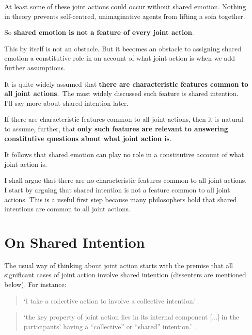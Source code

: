 \documentclass[12pt,a4paper]{extarticle}
\begin{document}
At least some of these joint actions could occur without shared emotion.  Nothing in theory prevents self-centred, unimaginative agents from lifting a sofa together.

So \textbf{shared emotion is not a feature of every joint action}.

This by itself is not an obstacle.  But it becomes an obstacle to assigning shared emotion a constitutive role in an account of what joint action is when we add further assumptions.

It is quite widely assumed that \textbf{there are characteristic features common to all joint actions}.\footnotemark \  The most widely discussed such feature is shared intention.  I'll say more about shared intention later.

If there are characteristic features common to all joint actions, then it is natural to assume, further, that \textbf{only such features are relevant to answering constitutive questions about what joint action is}.

It follows that shared emotion can play no role in a constitutive account of what joint action is.

I shall argue that there are no characteristic features common to all joint actions.  I start by arguing that shared intention is not a feature common to all joint actions.  This is a useful first step because many philosophers hold that shared intentions are common to all joint actions. 


\section{On Shared Intention}

The usual way of thinking about joint action starts with the premise that all significant cases of joint action involve shared intention (dissenters are mentioned below).  For instance:  
\begin{quote} 
`I take a collective action to involve a collective intention.'  \citep[p.\ 5]{Gilbert:2006wr}.
\end{quote}
\begin{quote}
`the key property of joint action lies in its internal component [...] in the participants’ having a “collective” or “shared” intention.' \citep[pp. 444-5]{alonso_shared_2009}.
\end{quote}
\end{document}
